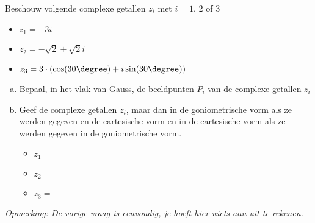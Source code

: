\documentclass[12pt]{article}
\begin{document}
Beschouw volgende complexe getallen $z_i$ met $i=1$, $2$ of $3$
\begin{itemize}
\item $z_1=-3i$
\item $z_2=-\sqrt{2}+\sqrt{2}i$
\item $z_3=3\cdot\left(\cos(30\degree)+i\sin(30\degree)\right)$
\end{itemize}
\begin{enumerate}[(a)]
\item Bepaal, in het vlak van Gauss, de beeldpunten $P_i$ van de complexe getallen $z_i$
  \begin{center}
  \end{center}
\item Geef de complexe getallen $z_i$, maar dan in de goniometrische vorm als ze werden gegeven en de cartesische vorm en in de cartesische vorm als ze werden gegeven in de goniometrische vorm.
\begin{itemize}
\item $z_1=$\arulefill
\item $z_2=$\arulefill
\item $z_3=$\arulefill
\end{itemize}
\end{enumerate}
{\em Opmerking: De vorige vraag is eenvoudig, je hoeft hier niets aan uit te rekenen.}
\end{document}
